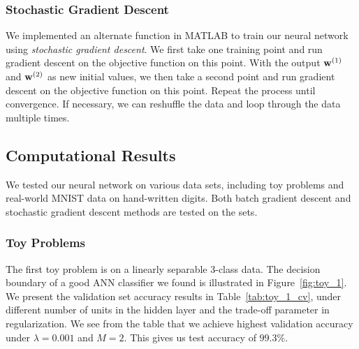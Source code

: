 \subsubsection{Stochastic Gradient Descent}

We implemented an alternate function in MATLAB to train our neural network using \textit{stochastic gradient descent}. We first take one training point and run gradient descent on the objective function on this point. With the output $\boldsymbol{\mathbf{w}}^{(1)}$ and $\boldsymbol{\mathbf{w}}^{(2)}$ as new initial values, we then take a second point and run gradient descent on the objective function on this point. Repeat the process until convergence. If necessary, we can reshuffle the data and loop through the data multiple times.


\subsection{Computational Results}

We tested our neural network on various data sets, including toy problems and real-world MNIST data on hand-written digits. Both batch gradient descent and stochastic gradient descent methods are tested on the sets. 


\subsubsection{Toy Problems}

The first toy problem is on a linearly separable 3-class data. The decision boundary of a good ANN classifier we found is illustrated in Figure~\ref{fig:toy_1}. We present the validation set accuracy results in Table~\ref{tab:toy_1_cv}, under different number of units in the hidden layer and the trade-off parameter in regularization. We see from the table that we achieve highest validation accuracy under $\lambda = 0.001$ and $M = 2$. This gives us test accuracy of $99.3\%$. 


